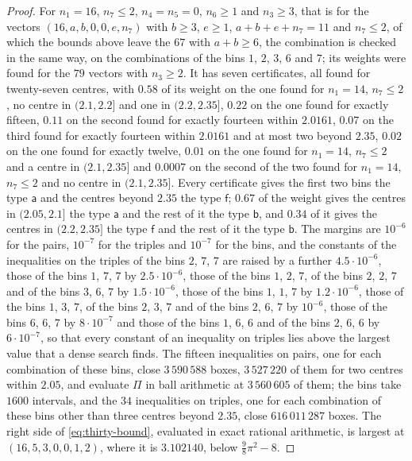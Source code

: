 \documentclass[11pt,reqno]{amsart}
\renewcommand{\_}{\origunderscore\allowbreak}
\numberwithin{equation}{section}
\theoremstyle{plain}
\theoremstyle{definition}
\theoremstyle{remark}
\begin{document}
\begin{proof}
For $n_1=16$, $n_7\le2$, $n_4=n_5=0$, $n_6\ge1$ and $n_3\ge3$, that is
for the vectors $(16,a,b,0,0,e,n_7)$ with $b\ge3$, $e\ge1$,
$a+b+e+n_7=11$ and $n_7\le2$, of which the bounds above leave the $67$
with $a+b\ge6$, the combination is checked in the same way, on the
combinations of the bins $1$, $2$, $3$, $6$ and $7$; its weights were
found for the $79$ vectors with $n_3\ge2$. It has seven certificates, all
found for twenty-seven centres, with $0.58$ of its weight on the one found
for $n_1=14$, $n_7\le2$, no centre in $(2.1,2.2]$ and one in
$(2.2,2.35]$, $0.22$ on the one found for exactly fifteen, $0.11$ on the
second found for exactly fourteen within $2.0161$, $0.07$ on the third
found for exactly fourteen within $2.0161$ and at most two beyond $2.35$,
$0.02$ on the one found for exactly twelve, $0.01$ on the one found for
$n_1=14$, $n_7\le2$ and a centre in $(2.1,2.35]$ and $0.0007$ on the
second of the two found for $n_1=14$, $n_7\le2$ and no centre in
$(2.1,2.35]$. Every certificate gives the first two bins the type
$\mathsf a$ and the centres beyond $2.35$ the type $\mathsf f$; $0.67$ of
the weight gives the centres in $(2.05,2.1]$ the type $\mathsf a$ and the
rest of it the type $\mathsf b$, and $0.34$ of it gives the centres in
$(2.2,2.35]$ the type $\mathsf f$ and the rest of it the type $\mathsf b$.
The margins are $10^{-6}$ for the pairs, $10^{-7}$ for the triples and
$10^{-7}$ for the bins, and the constants of the inequalities on the
triples of the bins $2$, $7$, $7$ are raised by a further
$4.5\cdot10^{-6}$, those of the bins $1$, $7$, $7$ by $2.5\cdot10^{-6}$,
those of the bins $1$, $2$, $7$, of the bins $2$, $2$, $7$ and of the bins
$3$, $6$, $7$ by $1.5\cdot10^{-6}$, those of the bins $1$, $1$, $7$ by
$1.2\cdot10^{-6}$, those of the bins $1$, $3$, $7$, of the bins $2$, $3$,
$7$ and of the bins $2$, $6$, $7$ by $10^{-6}$, those of the bins $6$,
$6$, $7$ by $8\cdot10^{-7}$ and those of the bins $1$, $6$, $6$ and of the
bins $2$, $6$, $6$ by $6\cdot10^{-7}$, so that every constant of an
inequality on triples lies above the largest value that a dense search
finds. The fifteen inequalities on pairs, one for each combination of
these bins, close $3\,590\,588$ boxes, $3\,527\,220$ of them for two
centres within $2.05$, and evaluate $\Pi$ in ball arithmetic at
$3\,560\,605$ of them; the bins take $1600$ intervals, and the $34$
inequalities on triples, one for each combination of these bins other than
three centres beyond $2.35$, close $616\,011\,287$ boxes. The right side
of \eqref{eq:thirty-bound}, evaluated in exact rational arithmetic, is
largest at $(16,5,3,0,0,1,2)$, where it is $3.102140$, below
$\frac98\pi^2-8$.


\end{proof}
\end{document}
